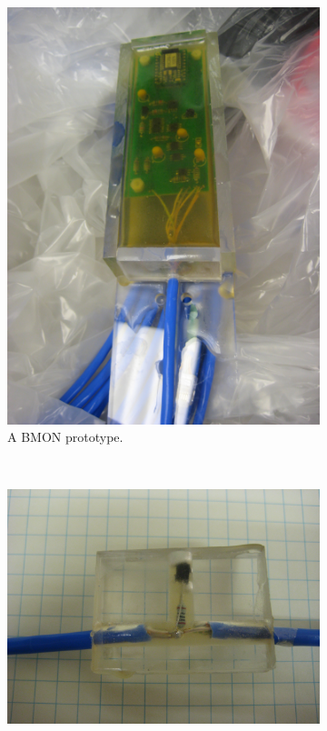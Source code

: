 \documentclass{JINST}
\begin{document}
\begin{figure}
        \centering
        \begin{subfigure}[b]{0.5\textwidth}
                \centering
                \includegraphics[width=\textwidth]{IMG_2884.JPG}
                \caption{A BMON prototype.}
                \label{fig4a}
        \end{subfigure}%
        ~ %
        \begin{subfigure}[b]{0.5\textwidth}
                \centering
                \includegraphics[width=\textwidth]{IMG_2883.JPG}

\end{subfigure}
\end{figure}
\end{document}
